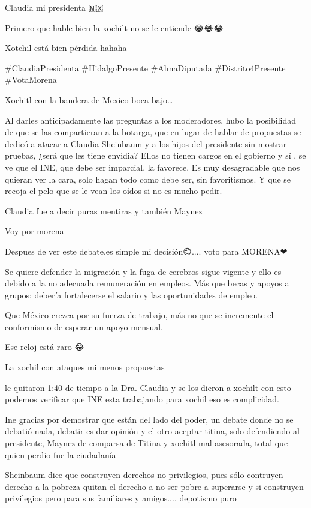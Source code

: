Claudia mi presidenta 🇲🇽

Primero que hable bien la xochilt no se le entiende 😂😂😂

Xotchil está bien pérdida hahaha

#ClaudiaPresidenta
#HidalgoPresente 
#AlmaDiputada
#Distrito4Presente
#VotaMorena

Xochitl con la bandera de Mexico boca bajo…

Al  darles anticipadamente  las preguntas a los moderadores, hubo la posibilidad de que se las compartieran a la botarga, que en lugar de hablar de propuestas se dedicó a atacar a Claudia Sheinbaum y a los hijos del presidente sin mostrar pruebas, ¿será que les tiene envidia? Ellos no tienen cargos en el gobierno y sí , se ve que el INE, que debe ser imparcial, la favorece.  Es muy desagradable que nos quieran ver la cara, solo hagan todo como debe ser, sin favoritismos. Y que se recoja el pelo que se le vean los oídos si no es mucho pedir.

Claudia fue a decir puras mentiras y también Maynez

Voy por morena

Despues de ver este debate,es simple mi decisión😊.... voto para MORENA❤

Se quiere defender la migración y la fuga de cerebros sigue vigente y ello es debido a la no adecuada remuneración en empleos. Más que becas y apoyos a grupos; debería fortalecerse el salario y las oportunidades de empleo.

Que México crezca por su fuerza de trabajo, más no que se incremente el conformismo de esperar un apoyo mensual.

Ese reloj está raro 😂

La xochil con ataques mi menos propuestas

le quitaron 1:40 de tiempo a la Dra. Claudia y se los dieron a xochilt con esto podemos verificar que INE esta trabajando para xochil eso es complicidad.

Ine gracias por demostrar que están del lado del poder, un debate donde no se debatió nada, debatir es dar opinión y el otro aceptar titina, solo defendiendo al presidente, Maynez de comparsa de Titina y xochitl mal asesorada, total que quien perdio fue la ciudadanía

Sheinbaum dice que construyen derechos no privilegios, pues sólo contruyen derecho a la pobreza quitan el derecho a no ser pobre a superarse y si construyen privilegios pero para sus familiares y amigos.... depotismo puro

